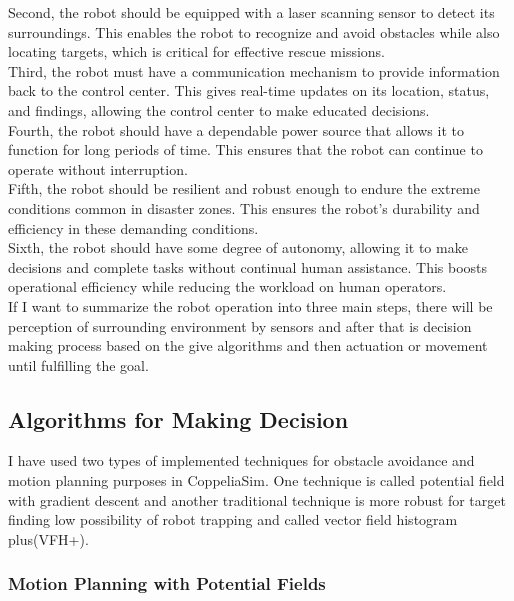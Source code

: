 Second, the robot should be equipped with a laser scanning sensor to detect its surroundings. This enables the robot to recognize and avoid obstacles while also locating targets, which is critical for effective rescue missions. \\

Third, the robot must have a communication mechanism to provide information back to the control center. This gives real-time updates on its location, status, and findings, allowing the control center to make educated decisions.\\

Fourth, the robot should have a dependable power source that allows it to function for long periods of time. This ensures that the robot can continue to operate without interruption.\\

Fifth, the robot should be resilient and robust enough to endure the extreme conditions common in disaster zones. This ensures the robot's durability and efficiency in these demanding conditions.\\

Sixth, the robot should have some degree of autonomy, allowing it to make decisions and complete tasks without continual human assistance. This boosts operational efficiency while reducing the workload on human operators.\\

If I want to summarize the robot operation into three main steps, there will be perception of surrounding environment by sensors and after that is decision making process based on the give algorithms and then actuation or movement until fulfilling the goal. 

\subsection{Algorithms for Making Decision }
I have used two types of implemented techniques for obstacle avoidance and motion planning purposes in CoppeliaSim. One technique is called potential field with gradient descent and another traditional technique is more robust for target finding low possibility of robot trapping and called vector field histogram plus(VFH+). 

\subsubsection{Motion Planning with Potential Fields }

